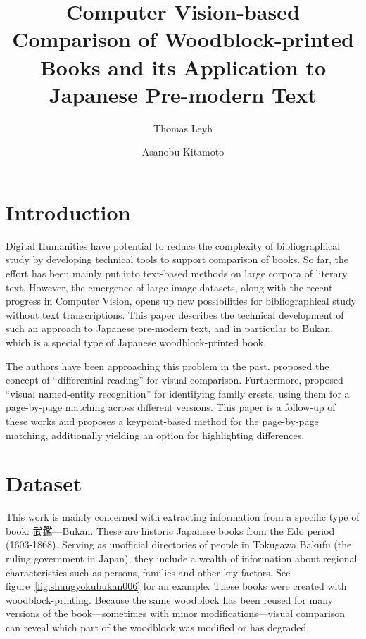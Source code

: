 \documentclass{ltjarticle}
\title{Computer Vision-based Comparison of Woodblock-printed Books and its Application to Japanese Pre-modern Text}
\author[1,3]{Thomas Leyh}
\author[2,3]{Asanobu Kitamoto}
\affil[1]{University of Freiburg}
\affil[2]{ROIS-DS Center for Open Data in the Humanities}
\affil[3]{National Institute of Informatics}
\begin{document}
\maketitle

\section{Introduction}

Digital Humanities have potential to reduce the complexity of bibliographical study by developing technical tools to support comparison of books. So far, the effort has been mainly put into text-based methods on large corpora of literary text. However, the emergence of large image datasets, along with the recent progress in Computer Vision, opens up new possibilities for bibliographical study without text transcriptions. This paper describes the technical development of such an approach to Japanese pre-modern text, and in particular to Bukan, which is a special type of Japanese woodblock-printed book.

The authors have been approaching this problem in the past. \cite{kitamoto2018} proposed the concept of “differential reading” for visual comparison. Furthermore, \cite{hakim2019} proposed “visual named-entity recognition” for identifying family crests, using them for a page-by-page matching across different versions. This paper is a follow-up of these works and proposes a keypoint-based method for the page-by-page matching, additionally yielding an option for highlighting differences. 

\section{Dataset}

This work is mainly concerned with extracting information from a specific type of book: 武鑑---Bukan. These are historic Japanese books from the Edo period (1603-1868). Serving as unofficial directories of people in Tokugawa Bakufu (the ruling government in Japan), they include a wealth of information about regional characteristics such as persons, families and other key factors. See figure~\ref{fig:shuugyokubukan006} for an example. These books were created with woodblock-printing. Because the same woodblock has been reused for many versions of the book---sometimes with minor modifications---visual comparison can reveal which part of the woodblock was modified or has degraded.
\end{document}
